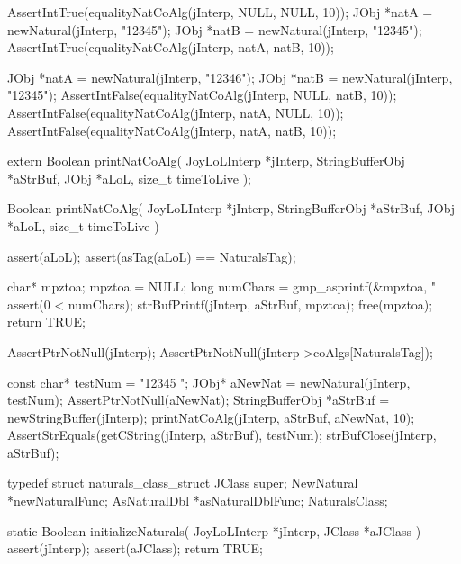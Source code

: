 \startCTest
  AssertIntTrue(equalityNatCoAlg(jInterp, NULL, NULL, 10));
  JObj *natA = newNatural(jInterp, "12345");
  JObj *natB = newNatural(jInterp, "12345");
  AssertIntTrue(equalityNatCoAlg(jInterp, natA, natB, 10));
\stopCTest
\stopTestCase


\startCTest
  JObj *natA = newNatural(jInterp, "12346");
  JObj *natB = newNatural(jInterp, "12345");
  AssertIntFalse(equalityNatCoAlg(jInterp, NULL, natB, 10));
  AssertIntFalse(equalityNatCoAlg(jInterp, natA, NULL, 10));
  AssertIntFalse(equalityNatCoAlg(jInterp, natA, natB, 10));
\stopCTest
\stopTestCase
\stopTestSuite



\startCHeader
extern Boolean printNatCoAlg(
  JoyLoLInterp    *jInterp,
  StringBufferObj *aStrBuf,
  JObj            *aLoL,
  size_t           timeToLive
);
\stopCHeader
{}

\startCCode
Boolean printNatCoAlg(
  JoyLoLInterp    *jInterp,
  StringBufferObj *aStrBuf,
  JObj            *aLoL,
  size_t           timeToLive
) {
  assert(aLoL);
  assert(asTag(aLoL) == NaturalsTag);

  char* mpztoa;
  mpztoa = NULL;
  long numChars = gmp_asprintf(&mpztoa, "%
  assert(0 < numChars);
  strBufPrintf(jInterp, aStrBuf, mpztoa);
  free(mpztoa);
  return TRUE;
}
\stopCCode


\startCTest
  AssertPtrNotNull(jInterp);
  AssertPtrNotNull(jInterp->coAlgs[NaturalsTag]);

  const char* testNum = "12345 ";
  JObj* aNewNat = newNatural(jInterp, testNum);
  AssertPtrNotNull(aNewNat);
  StringBufferObj *aStrBuf = newStringBuffer(jInterp);
  printNatCoAlg(jInterp, aStrBuf, aNewNat, 10);
  AssertStrEquals(getCString(jInterp, aStrBuf), testNum);
  strBufClose(jInterp, aStrBuf);
\stopCTest
\stopTestCase
\stopTestSuite

\startTestSuite[registerSymbols]

\startCHeader
typedef struct naturals_class_struct {
  JClass super;
  NewNatural   *newNaturalFunc;
  AsNaturalDbl *asNaturalDblFunc;
} NaturalsClass;
\stopCHeader

\startCCode
static Boolean initializeNaturals(
  JoyLoLInterp *jInterp,
  JClass   *aJClass
) {
  assert(jInterp);
  assert(aJClass);
  return TRUE;
}
\stopCCode

